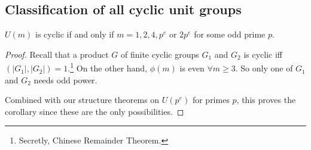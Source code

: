 \subsection{Classification of all cyclic unit groups}
\begin{corollary}\label{cor:cyclicity-of-unit-groups}
    $U(m)$ is cyclic if and only if $m = 1, 2, 4, p^e$ or $2p^e$ for some odd prime $p$.
\end{corollary}
\begin{proof}
    Recall that a product $G$ of finite cyclic groups $G_1$ and $G_2$ is cyclic iff $(|G_1|, |G_2|) = 1$.\footnote{Secretly, Chinese Remainder Theorem.} On the other hand, $\phi(m)$ is even $\forall m\geq 3$. So only one of $G_1$ and $G_2$ needs odd power.

    Combined with our structure theorems on $U(p^e)$ for primes $p$, this proves the corollary since these are the only possibilities.
\end{proof}